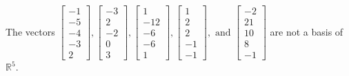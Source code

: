 \begin{exercise}
\begin{exerciseStatement}
  \end{exerciseStatement}
  \begin{exerciseAnswer}
   The vectors \(\left[\begin{array}{r}
-1 \\
-5 \\
-4 \\
-3 \\
2
\end{array}\right] , \left[\begin{array}{r}
-3 \\
2 \\
-2 \\
0 \\
3
\end{array}\right] , \left[\begin{array}{r}
1 \\
-12 \\
-6 \\
-6 \\
1
\end{array}\right] , \left[\begin{array}{r}
1 \\
2 \\
2 \\
-1 \\
-1
\end{array}\right] , \text{ and } \left[\begin{array}{r}
-2 \\
21 \\
10 \\
8 \\
-1
\end{array}\right]\) 
  	 are not  a basis of \(\mathbb{R}^5\).
  


  \end{exerciseAnswer}
\end{exercise}